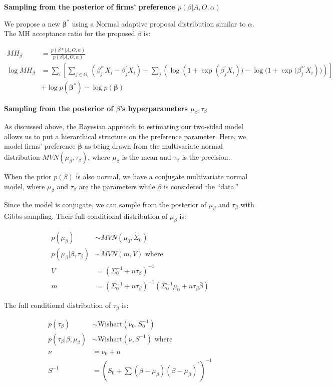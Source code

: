 \textbf{Sampling from the posterior of firms' preference $p(\beta|A, O,
  \alpha)$}

We propose a new $\bm{\beta}^*$ using a Normal adaptive proposal distribution
similar to $\alpha$. The MH acceptance ratio for the proposed $\beta$ is:

\begin{align}
  MH_\beta &= \frac{p(\beta* | A, O, \alpha)}{p(\beta | A, O, \alpha)} \\
  \log MH_\beta &= \sum_i \left[ \sum_{j \in O_i} \left(\beta_j^{*\prime}X_i - \beta_j^{\prime}X_i \right) + \sum_{j} \left( \log(1 + {\exp({\beta_j^{\prime}X_i})) - \log(1 +  \exp(\beta_j^{*\prime}X_i})) \right) \right] \nonumber \\
           & + \log p(\bm{\beta}^*) - \log p(\bm{\beta})
\end{align}


\textbf{Sampling from the posterior of $\beta$'s hyperparameters $\mu_{\beta},
  \tau_{\beta}$}

As discussed above, the Bayesian approach to estimating our two-sided model
allows us to put a hierarchical structure on the preference parameter. Here, we
model firms' preference $\bm{\beta}$ as being drawn from the multivariate normal
distribution $MVN(\mu_{\beta}, \tau_{\beta})$, where $\mu_{\beta}$ is the mean
and $\tau_{\beta}$ is the precision.

When the prior $p(\beta)$ is also normal, we have a conjugate multivariate
normal model, where $\mu_{\beta}$ and $\tau_{\beta}$ are the parameters while
$\beta$ is considered the ``data.''

Since the model is conjugate, we can sample from the posterior of $\mu_{\beta}$
and $\tau_{\beta}$ with Gibbs sampling. Their full conditional distribution of
$\mu_{\beta}$ is:

\begin{align}
  p(\mu_{\beta}) &\sim MVN(\mu_0, \Sigma_0) \\
  p(\mu_{\beta} | \beta, \tau_{\beta}) &\sim MVN(m, V) \text{ where } \\
  V &= (\Sigma_0^{-1} + n \tau_{\beta})^{-1} \\
  m &= (\Sigma_0^{-1} + n \tau_{\beta})^{-1} (\Sigma_0^{-1}\mu_0 + n \tau_{\beta} \bar \beta)
\end{align}

The full conditional distribution of $\tau_{\beta}$ is:

\begin{align}
  p(\tau_{\beta}) &\sim \text{Wishart}(\nu_0, S_0^{-1}) \\
  p(\tau_{\beta} | \beta, \mu_{\beta}) &\sim \text{Wishart}(\nu, S^{-1}) \text{ where } \\
  \nu &= \nu_0 + n \\
  S^{-1} &= \left(S_0 + \sum (\beta - \mu_{\beta})(\beta - \mu_{\beta})^{\prime}\right)^{-1}
\end{align}


